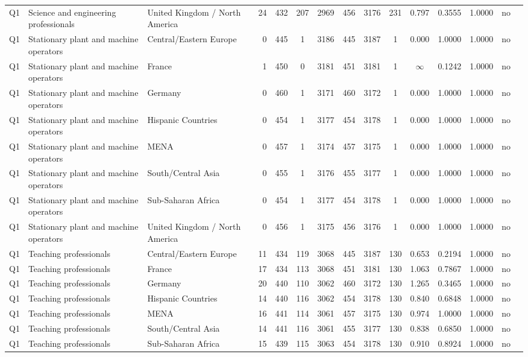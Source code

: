 \begin{longtable}{lllrcccccccccll}
Q1 & Science and engineering professionals & United Kingdom / North America & 24 & 432 & 207 & 2969 & 456 & 3176 & 231 & 0.797 & 0.3555 & 1.0000 & no \\
Q1 & Stationary plant and machine operators & Central/Eastern Europe & 0 & 445 & 1 & 3186 & 445 & 3187 & 1 & 0.000 & 1.0000 & 1.0000 & no \\
Q1 & Stationary plant and machine operators & France & 1 & 450 & 0 & 3181 & 451 & 3181 & 1 & $\infty$ & 0.1242 & 1.0000 & no \\
Q1 & Stationary plant and machine operators & Germany & 0 & 460 & 1 & 3171 & 460 & 3172 & 1 & 0.000 & 1.0000 & 1.0000 & no \\
Q1 & Stationary plant and machine operators & Hispanic Countries & 0 & 454 & 1 & 3177 & 454 & 3178 & 1 & 0.000 & 1.0000 & 1.0000 & no \\
Q1 & Stationary plant and machine operators & MENA & 0 & 457 & 1 & 3174 & 457 & 3175 & 1 & 0.000 & 1.0000 & 1.0000 & no \\
Q1 & Stationary plant and machine operators & South/Central Asia & 0 & 455 & 1 & 3176 & 455 & 3177 & 1 & 0.000 & 1.0000 & 1.0000 & no \\
Q1 & Stationary plant and machine operators & Sub-Saharan Africa & 0 & 454 & 1 & 3177 & 454 & 3178 & 1 & 0.000 & 1.0000 & 1.0000 & no \\
Q1 & Stationary plant and machine operators & United Kingdom / North America & 0 & 456 & 1 & 3175 & 456 & 3176 & 1 & 0.000 & 1.0000 & 1.0000 & no \\
Q1 & Teaching professionals & Central/Eastern Europe & 11 & 434 & 119 & 3068 & 445 & 3187 & 130 & 0.653 & 0.2194 & 1.0000 & no \\
Q1 & Teaching professionals & France & 17 & 434 & 113 & 3068 & 451 & 3181 & 130 & 1.063 & 0.7867 & 1.0000 & no \\
Q1 & Teaching professionals & Germany & 20 & 440 & 110 & 3062 & 460 & 3172 & 130 & 1.265 & 0.3465 & 1.0000 & no \\
Q1 & Teaching professionals & Hispanic Countries & 14 & 440 & 116 & 3062 & 454 & 3178 & 130 & 0.840 & 0.6848 & 1.0000 & no \\
Q1 & Teaching professionals & MENA & 16 & 441 & 114 & 3061 & 457 & 3175 & 130 & 0.974 & 1.0000 & 1.0000 & no \\
Q1 & Teaching professionals & South/Central Asia & 14 & 441 & 116 & 3061 & 455 & 3177 & 130 & 0.838 & 0.6850 & 1.0000 & no \\
Q1 & Teaching professionals & Sub-Saharan Africa & 15 & 439 & 115 & 3063 & 454 & 3178 & 130 & 0.910 & 0.8924 & 1.0000 & no \\

\end{longtable}
